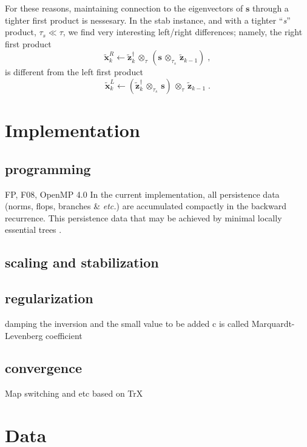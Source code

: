 \documentclass[letterpaper,twocolumn,amsmath,amsfont,amssymb,english,aps,jcp,preprintnumbers,groupaddress,nofootinbib,tightenlines]{revtex4}
\newcommand{\mat}[1]{\boldsymbol{#1}}
\newcommand{\ot}{ {\scriptstyle \otimes}_{ \tau } }
\newcommand{\ots}{ {\scriptstyle \otimes}_{ \tau_s } }
\begin{document}
For these reasons, maintaining connection to the eigenvectors of $\mat{s}$ through 
a tighter first product is nessesary.  In the stab instance, and with a 
tighter ``{\em s}'' product, $\tau_s \ll \tau$, we find very interesting left/right differences; 
namely, the right first product 
\begin{equation} 
\widetilde{\mat{x}}^R_k \leftarrow \widetilde{\mat{z}}^\dagger_{k} \, \ot  \, \left( \mat{s} \,  \ots \, \widetilde{\mat{z}}_{k-1}  \right) \; ,
\end{equation}
is  different from the left first product 
\begin{equation} 
\widetilde{\mat{x}}^L_k \leftarrow \left(  \widetilde{\mat{z}}^\dagger_{k} \, \ots \, \mat{s} \right) \,  \ot  \, \widetilde{\mat{z}}_{k-1} \; .
\end{equation}

\section{Implementation}

\subsection{programming}

FP, F08, OpenMP 4.0
In the current implementation, all persistence data
(norms, flops, branches \& {\em etc.}) are accumulated compactly in the backward recurrence.  This persistence data
 that may be achieved by minimal locally essential trees \cite{}.


\subsection{scaling and stabilization}

\subsection{regularization}
damping the inversion and the small value to be added c is called Marquardt-Levenberg coefficient

\subsection{convergence}

Map switching and etc based on TrX

\section{Data}
\end{document}
